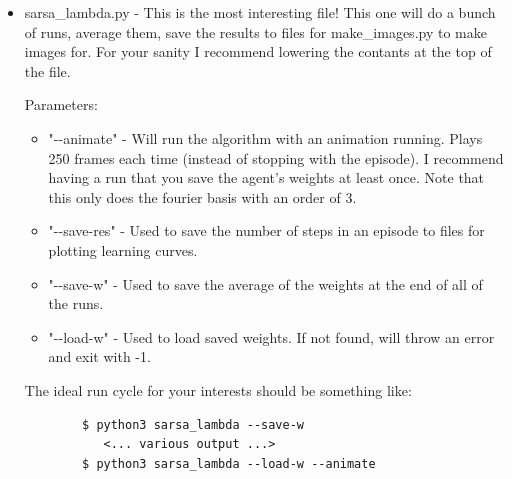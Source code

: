 \documentclass{article}
\begin{document}
\begin{itemize}
\item sarsa\_lambda.py - \Large{This is the most interesting file!} \normalsize This one will do a bunch of runs, average them, 
    save the results to files for make\_images.py to make images for. For your sanity I recommend lowering the contants at the top of the file. 

    Parameters:
    \begin{itemize}
        \item "-\--animate" - Will run the algorithm with an animation running.
            Plays 250 frames each time (instead of stopping with the episode).
            I recommend having a run that you save the agent's weights at least
            once. Note that this only does the fourier basis with an order of
            3. 
        \item "-\--save-res" - Used to save the number of steps in an episode to files for plotting learning curves.
        \item "-\--save-w" - Used to save the average of the weights at the end of all of the runs.  
        \item "-\--load-w" - Used to load saved weights. If not found, will throw an error and exit with -1.
    \end{itemize}

    The ideal run cycle for your interests should be something like: 
    \begin{verbatim}
        $ python3 sarsa_lambda --save-w
           <... various output ...>
        $ python3 sarsa_lambda --load-w --animate
    \end{verbatim}
\end{itemize}
\end{document}
